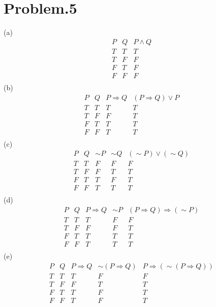 \documentclass[12pt]{article}
\begin{document}
\section*{Problem.5}
(a)
\begin{displaymath}
\begin{array}{|c|c|c|}
P & Q & P \land Q\\ 
\hline
T & T & T\\
T & F & F\\
F & T & F\\
F & F & F\\
\end{array}
\end{displaymath}
(b)
\begin{displaymath}
\begin{array}{|c|c|c|c|}
P & Q & P \Rightarrow Q & (P \Rightarrow Q) \lor P\\ 
\hline
T & T & T & T\\
T & F & F & T\\
F & T & T & T\\
F & F & T & T\\
\end{array}
\end{displaymath}
(c)
\begin{displaymath}
\begin{array}{|c|c|c|c|c|}
P & Q & \sim P & \sim Q & (\sim P) \lor (\sim Q)\\ 
\hline
T & T & F & F & F\\
T & F & F & T & T\\
F & T & T & F & T\\
F & F & T & T & T\\
\end{array}
\end{displaymath}
(d)
\begin{displaymath}
\begin{array}{|c|c|c|c|c|}
P & Q & P \Rightarrow Q & \sim P & (P \Rightarrow Q) \Rightarrow (\sim P)\\ 
\hline
T & T & T & F & F\\
T & F & F & F & T\\
F & T & T & T & T\\
F & F & T & T & T\\
\end{array}
\end{displaymath}
(e)
\begin{displaymath}
\begin{array}{|c|c|c|c|c|}
P & Q & P \Rightarrow Q & \sim (P \Rightarrow Q) & P \Rightarrow (\sim (P \Rightarrow Q))\\ 
\hline
T & T & T & F & F\\
T & F & F & T & T\\
F & T & T & F & T\\
F & F & T & F & T\\
\end{array}
\end{displaymath}
\end{document}
